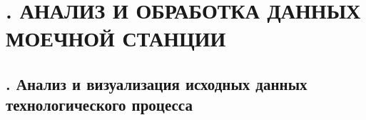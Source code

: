 \setcounter{chaptercntr}{3}

\sectionbreak \section*{
  \gostTitleFont
  \redline
  \thechaptercntr .
  АНАЛИЗ И ОБРАБОТКА ДАННЫХ МОЕЧНОЙ СТАНЦИИ
}

\titlespace

\subsection*{ 
  \gostTitleFont
  \redline
  \thechaptercntr .\thesubchaptercntr \spc
  Анализ и визуализация исходных данных технологического процесса
} \addtocounter{subchaptercntr}{1}

\subtitlespace

